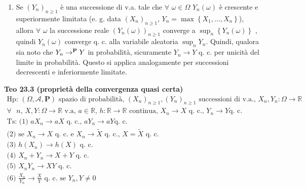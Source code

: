\documentclass{article}
\begin{document}
\begin{enumerate}
\item Se $\left( Y_{n}\right) _{n\geq 1}$ \`{e} una successione di v.a. tale
che $\forall $ $\omega \in \Omega $ $Y_{n}\left( \omega \right) $ \`{e}
crescente e superiormente limitata (e. g. data $\left( X_{n}\right) _{n\geq
1}$, $Y_{n}=\max \left\{ X_{1},...,X_{n}\right\} $), allora $\forall $ $%
\omega $ la successione reale $\left( Y_{n}\left( \omega \right) \right)
_{n\geq 1}$ converge a $\sup_{n}\left\{ Y_{n}\left( \omega \right) \right\} $%
, quindi $Y_{n}\left( \omega \right) $ converge q. c. alla variabile
aleatoria $\sup_{n}Y_{n}$. Quindi, qualora sia noto che $Y_{n}\rightarrow ^{%
\mathbf{P}}Y$ in probabilit\`{a}, sicuramente $Y_{n}\rightarrow Y$ q. c. per
unicit\`{a} del limite in probabilit\`{a}. Questo si applica analogamente
per successioni decrescenti e inferiormente limitate.
\end{enumerate}

\textbf{Teo 23.3 (propriet\`{a} della convergenza quasi certa)}%
\begin{gather*}
\text{Hp: }\left( \Omega ,\mathcal{A},\mathbf{P}\right) \text{ spazio di
probabilit\`{a}, }\left( X_{n}\right) _{n\geq 1},\left( Y_{n}\right) _{n\geq
1}\text{ successioni di v.a., }X_{n},Y_{n}:\Omega \rightarrow 
\mathbb{R}
\text{ } \\
\forall \text{ }n\text{, }X,Y:\Omega \rightarrow 
\mathbb{R}
\text{ v.a, }a\in 
\mathbb{R}
\text{, }h:%
\mathbb{R}
\rightarrow 
\mathbb{R}
\text{ continua, }X_{n}\rightarrow X\text{ q. c., }Y_{n}\rightarrow Y\text{
q. c.} \\
\text{Ts: (1) }aX_{n}\rightarrow aX\text{ q. c., }aY_{n}\rightarrow aY\text{
q. c.} \\
\text{(2) se }X_{n}\rightarrow X\text{ q. c. e }X_{n}\rightarrow \tilde{X}%
\text{ q. c., }X=\tilde{X}\text{ q. c.} \\
\text{(3) }h\left( X_{n}\right) \rightarrow h\left( X\right) \text{ q. c.} \\
\text{(4) }X_{n}+Y_{n}\rightarrow X+Y\text{ q. c.} \\
\text{(5) }X_{n}Y_{n}\rightarrow XY\text{ q. c.} \\
\text{(6) }\frac{X_{n}}{Y_{n}}\rightarrow \frac{X}{Y}\text{ q. c. se }%
Y_{n},Y\neq 0
\end{gather*}
\end{document}
